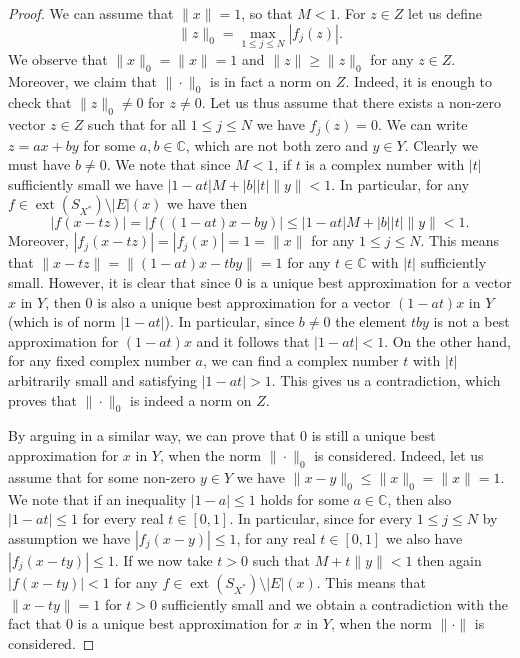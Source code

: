 \documentclass[12pt, reqno]{amsart}
\theoremstyle{definition}
\theoremstyle{remark}
\numberwithin{equation}{section}
\DeclareMathOperator{\ext}{ext}
\begin{document}
\begin{proof}
We can assume that $\|x\|=1$, so that $M<1$. For $z \in Z$ let us define
$$\|z\|_0 = \max_{1 \leq j \leq N} |f_j(z)|.$$
We observe that $\|x\|_0=\|x\|=1$ and $\|z\| \geq \|z\|_0$ for any $z \in Z$. Moreover, we claim that $\| \cdot \|_0$ is in fact a norm on $Z$. Indeed, it is enough to check that $\|z\|_0 \neq 0$ for $z \neq 0$. Let us thus assume that there exists a non-zero vector $z \in Z$ such that for all $1 \leq j \leq N$ we have $f_j(z)=0$. We can write $z=ax+by$ for some $a, b \in \mathbb{C}$, which are not both zero and $y \in Y$. Clearly we must have $b \neq 0$. We note that since $M < 1$, if $t$ is a complex number with $|t|$ sufficiently small we have $|1-at|M + |b||t|\|y\| < 1$. In particular, for any $f \in \ext(S_{X^*})\setminus |E|(x)$ we have then
$$|f(x-tz)|=|f((1-at)x-by)| \leq |1-at|M + |b||t|\|y\| < 1.$$
Moreover, $|f_j(x-tz)|=|f_j(x)|=1=\|x\|$ for any $1 \leq j \leq N$. This means that $\|x-tz\| = \|(1-at)x - tby\|= 1$ for any $t \in \mathbb{C}$ with $|t|$ sufficiently small. However, it is clear that since $0$ is a unique best approximation for a vector $x$ in $Y$, then $0$ is also a unique best approximation for a vector $(1-at)x$ in $Y$ (which is of norm $|1-at|$). In particular, since $b \neq 0$ the element $tby$ is not a best approximation for $(1-at)x$ and it follows that $|1-at| < 1$. On the other hand, for any fixed complex number $a$, we can find a complex number $t$ with $|t|$ arbitrarily small and satisfying $|1-at|>1$. This gives us a contradiction, which proves that $\| \cdot \|_0$ is indeed a norm on $Z$.

By arguing in a similar way, we can prove that $0$ is still a unique best approximation for $x$ in $Y$, when the norm $\| \cdot \|_0$ is considered. Indeed, let us assume that for some non-zero $y \in Y$ we have $\|x-y\|_0 \leq \|x\|_0=\|x\|=1$. We note that if an inequality $\left | 1 - a \right | \leq 1$ holds for some $a \in \mathbb{C}$, then also $\left | 1 - a t \right | \leq 1$ for every real $t \in [0, 1]$. In particular, since for every $1 \leq j \leq N$ by assumption we have $|f_j(x-y)| \leq 1$, for any real $t \in [0, 1]$ we also have $|f_j(x-ty)| \leq 1$. If we now take $t>0$ such that $M+t\|y\|<1$ then again $|f(x-ty)| < 1$ for any $f \in \ext(S_{X^*})\setminus |E|(x)$. This means that $\|x-ty\|=1$ for $t>0$ sufficiently small and we obtain a contradiction with the fact that $0$ is a unique best approximation for $x$ in $Y$, when the norm $\| \cdot \|$ is considered.


\end{proof}
\end{document}
